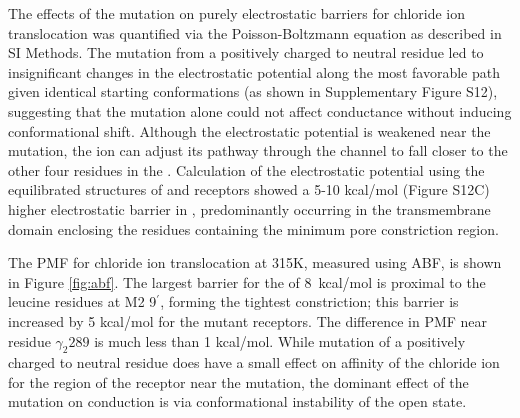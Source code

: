 \documentclass[9pt,twocolumn,twoside,lineno]{pnas-new}
\begin{document}
The effects of the mutation on purely electrostatic barriers for chloride ion translocation was quantified via the Poisson-Boltzmann equation as described in SI Methods.  The mutation from a positively charged to neutral residue led to insignificant changes in the electrostatic potential along the most favorable path given identical starting conformations (as shown in Supplementary Figure S12), suggesting that the mutation alone could not affect conductance without inducing conformational shift. Although the electrostatic potential is weakened near the mutation, the ion can adjust its pathway through the channel to fall closer to the other four residues in the \fiveringnos. 
Calculation of the electrostatic potential using the equilibrated structures of \WT and \MT receptors showed a 5-10 kcal/mol (Figure S12C) higher electrostatic barrier in \MT , predominantly occurring in the transmembrane domain enclosing the residues containing the minimum pore constriction region. 

The PMF for chloride ion translocation at 315K, measured using ABF, is shown in Figure \ref{fig:abf}. The largest barrier for the \WT of 8~kcal/mol is proximal to the leucine residues at M2 9$^{\prime}$, forming the tightest constriction; this barrier is increased by 5 kcal/mol for the mutant receptors. 
The difference in PMF near residue $\gamma_{2} 289$ is much less than 1 kcal/mol. %
While mutation of a positively charged to neutral residue does have a small effect on affinity of the chloride ion for the region of the receptor near the mutation, 
the dominant effect of the mutation on conduction is via conformational instability of the open state.  %
\end{document}

